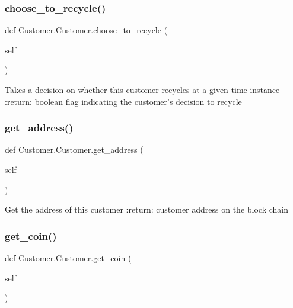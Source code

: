 \subsubsection{\texorpdfstring{choose\+\_\+to\+\_\+recycle()}{choose\_to\_recycle()}}
{\footnotesize\ttfamily def Customer.\+Customer.\+choose\+\_\+to\+\_\+recycle (\begin{DoxyParamCaption}\item[{}]{self }\end{DoxyParamCaption})}

\begin{DoxyVerb}Takes a decision on whether this customer recycles at a given time instance
:return: boolean flag indicating the customer's decision to recycle
\end{DoxyVerb}
 \mbox{\label{class_customer_1_1_customer_a77531667290ff6b0c5547ebf17930098}} 
\subsubsection{\texorpdfstring{get\+\_\+address()}{get\_address()}}
{\footnotesize\ttfamily def Customer.\+Customer.\+get\+\_\+address (\begin{DoxyParamCaption}\item[{}]{self }\end{DoxyParamCaption})}

\begin{DoxyVerb}Get the address of this customer
:return: customer address on the block chain
\end{DoxyVerb}
 \mbox{\label{class_customer_1_1_customer_a132ab8cbc2cdf93767fd1e7f295636c2}} 
\subsubsection{\texorpdfstring{get\+\_\+coin()}{get\_coin()}}
{\footnotesize\ttfamily def Customer.\+Customer.\+get\+\_\+coin (\begin{DoxyParamCaption}\item[{}]{self }\end{DoxyParamCaption})}

